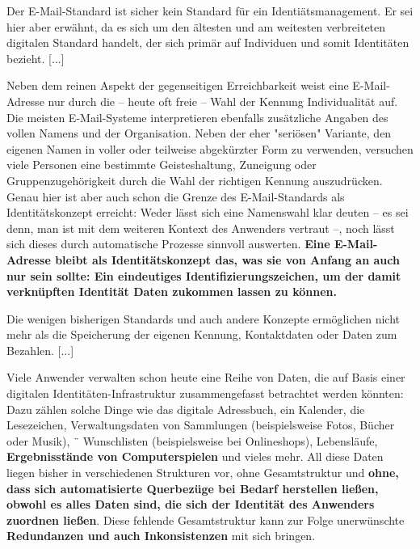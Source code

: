 \vspace{0.3cm}


\begin{Zitat}

Der E-Mail-Standard ist sicher kein Standard für ein Identiätsmanagement. Er sei hier
aber erwähnt, da es sich um den ältesten und am weitesten verbreiteten digitalen Standard handelt, der sich primär auf Individuen und somit Identitäten bezieht. [...]

Neben dem reinen Aspekt der gegenseitigen Erreichbarkeit weist eine E-Mail-Adresse
nur durch die – heute oft freie – Wahl der Kennung Individualität auf. Die meisten E-Mail-Systeme interpretieren ebenfalls zusätzliche Angaben des vollen Namens und der
Organisation. Neben der eher "seriösen" Variante, den eigenen Namen in voller oder teilweise abgekürzter Form zu verwenden, versuchen viele Personen eine bestimmte Geisteshaltung, Zuneigung oder Gruppenzugehörigkeit durch die Wahl der richtigen Kennung
auszudrücken. Genau hier ist aber auch schon die Grenze des E-Mail-Standards als Identitätskonzept erreicht: Weder lässt sich eine Namenswahl klar deuten – es sei denn, man ist mit dem weiteren Kontext des Anwenders vertraut –, noch lässt sich dieses durch automatische Prozesse sinnvoll auswerten. \textbf{Eine E-Mail-Adresse bleibt als Identitätskonzept das, was sie von Anfang an auch nur sein sollte: Ein eindeutiges  Identifizierungszeichen, um der damit verknüpften Identität Daten zukommen lassen zu können.}

\end{Zitat}

\vspace{0.3cm}


\begin{Zitat}

Die wenigen bisherigen Standards und auch andere Konzepte ermöglichen nicht mehr
als die Speicherung der eigenen Kennung, Kontaktdaten oder Daten zum Bezahlen. [...]

Viele Anwender verwalten schon heute eine Reihe von Daten, die auf Basis einer
digitalen Identitäten-Infrastruktur zusammengefasst betrachtet werden könnten: Dazu
zählen solche Dinge wie das digitale Adressbuch, ein Kalender, die Lesezeichen, Verwaltungsdaten von Sammlungen (beispielsweise Fotos, Bücher oder Musik), ¨
Wunschlisten (beispielsweise bei Onlineshops), Lebensläufe, \textbf{Ergebnisstände von Computerspielen} und vieles mehr. All diese Daten liegen bisher in verschiedenen Strukturen vor, ohne Gesamtstruktur und \textbf{ohne, dass sich automatisierte Querbezüge bei Bedarf herstellen ließen, obwohl es alles Daten sind, die sich der Identität des Anwenders zuordnen ließen}. Diese fehlende Gesamtstruktur kann zur Folge unerwünschte \textbf{Redundanzen und auch Inkonsistenzen} mit sich bringen.

\end{Zitat}

